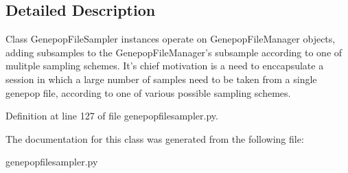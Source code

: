 \subsection{Detailed Description}
\begin{DoxyVerb}Class GenepopFileSampler instances operate on GenepopFileManager objects,
adding subsamples to the GenepopFileManager's subsample according to one of
mulitple sampling schemes.  It's chief motivation is a need to enccapsulate 
a session in which a large number of samples need to be taken from a single
genepop file, according to one of various possible sampling schemes.
\end{DoxyVerb}
 

Definition at line 127 of file genepopfilesampler.\+py.



The documentation for this class was generated from the following file\+:\begin{DoxyCompactItemize}
\item 
genepopfilesampler.\+py\end{DoxyCompactItemize}
